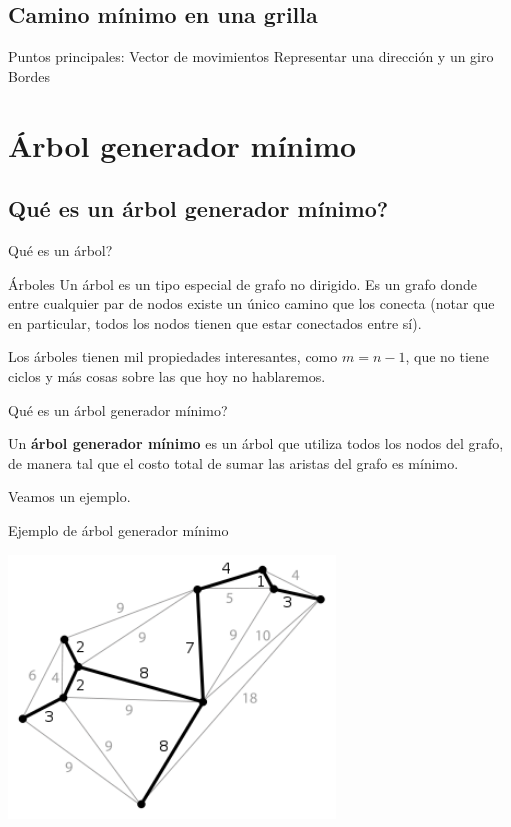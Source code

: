 \documentclass[compress]{beamer}
\begin{document}
\subsection{Camino mínimo en una grilla}
\begin{frame}
Puntos principales:
Vector de movimientos
Representar una dirección y un giro
Bordes

\end{frame}

\section{Árbol generador mínimo}

\subsection{\textquestiondown Qué es un árbol generador mínimo?}

\begin{frame}{\textquestiondown Qué es un árbol?}
\begin{block}{Árboles}
Un árbol es un tipo especial de grafo no dirigido. Es un grafo donde 
entre cualquier par de nodos existe un único camino que los conecta 
(notar que en particular, todos los nodos tienen que estar conectados entre sí).
\end{block}

Los árboles tienen mil propiedades interesantes, como $m = n -1$, 
que no tiene ciclos y más cosas sobre las que hoy no hablaremos.
\end{frame}

\begin{frame}{\textquestiondown Qué es un árbol generador mínimo?}

Un \textbf{árbol generador mínimo} es un árbol que utiliza todos los nodos
del grafo, de manera tal que el costo total de sumar las aristas del grafo
es mínimo.

\bigskip

Veamos un ejemplo.
\end{frame}

\begin{frame}{Ejemplo de árbol generador mínimo}
\begin{center}
\includegraphics[height=7cm]{mst.png} \\
\end{center}
\end{frame}
\end{document}
